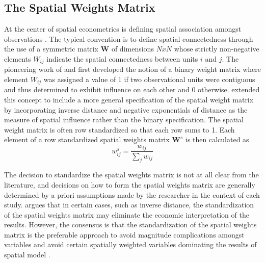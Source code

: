 \subsection{The Spatial Weights Matrix}

At the center of spatial econometrics is defining spatial association amongst observations \citep{Anselin1988, Arbia2006, Anselin2010}.  The typical convention is to define spatial connectedness through the use of a symmetric matrix $\mathbf{W}$ of dimensions $\mathit{NxN}$  whose strictly non-negative elements $W_{ij}$ indicate the spatial connectedness between units $i$ and $j$.  The pioneering work of \cite{Moran1950} and \cite{Geary1954} first developed the notion of a binary weight matrix where element $W_{ij}$ was assigned a value of 1 if two observational units were contiguous and thus determined to exhibit influence on each other and 0 otherwise.  \cite{cliff1973, cliff1981} extended this concept to include a more general specification of the spatial weight matrix by incorporating inverse distance and negative exponentials of distance as the measure of spatial influence rather than the binary specification.  The spatial weight matrix is often row standardized so that each row sums to 1.  Each element of a row standardized spatial weights matrix $\mathbf{W}^s$ is then calculated as%
\begin{equation}
w^{s}_{ij} =\frac{w_{ij}} {\displaystyle\sum_{j}w_{ij}}
\end{equation}

The decision to standardize the spatial weights matrix is not at all clear from the literature, and decisions on how to form the spatial weights matrix are generally determined by a priori assumptions made by the researcher in the context of each study. \cite{Anselin1988} argues that in certain cases, such as inverse distance, the standardization of the spatial weights matrix may eliminate the economic interpretation of the results.  However, the consensus is that the standardization of the spatial weights matrix is the preferable approach to avoid magnitude complications amongst variables and avoid certain spatially weighted variables dominating the results of spatial model \citep{LeSage2009}.

